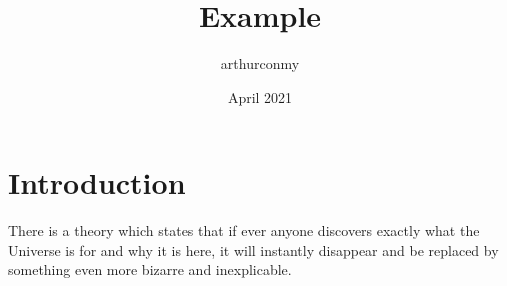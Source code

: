 \documentclass{article}
\title{Example}
\author{arthurconmy }
\date{April 2021}
\begin{document}
\maketitle

\section{Introduction}
There is a theory which states that if ever anyone discovers exactly what the Universe is for and why it is here, it will instantly disappear and be replaced by something even more bizarre and inexplicable.
\end{document}
